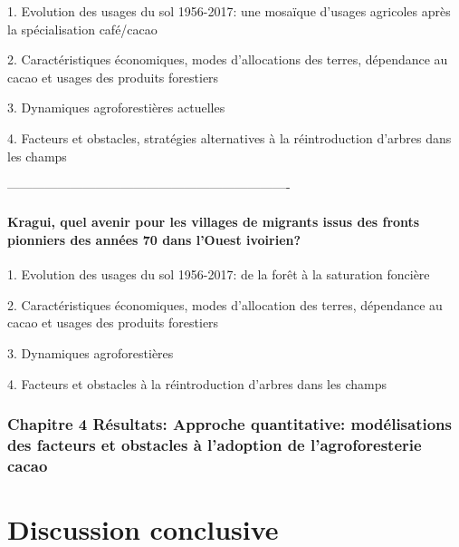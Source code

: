 \documentclass[a4paper,notitlepage]{article}
\begin{document}
1. Evolution des usages du sol 1956-2017: une mosaïque d'usages agricoles après la spécialisation café/cacao

2. Caractéristiques économiques, modes d'allocations des terres, dépendance au cacao et usages des produits forestiers

3. Dynamiques agroforestières actuelles

4. Facteurs et obstacles, stratégies alternatives à la réintroduction d'arbres dans les champs

-------------------------------------------------------------------

\subsection{Kragui, quel avenir pour les villages de migrants issus des fronts pionniers des années 70 dans l'Ouest ivoirien?}

1. Evolution des usages du sol 1956-2017: de la forêt à la saturation foncière

2. Caractéristiques économiques, modes d'allocation des terres, dépendance au cacao et usages des produits forestiers

3. Dynamiques agroforestières

4. Facteurs et obstacles à la réintroduction d'arbres dans les champs

\section{Chapitre 4 Résultats: Approche quantitative: modélisations des facteurs et obstacles à l'adoption de l'agroforesterie cacao}


\part{Discussion conclusive}
\end{document}
